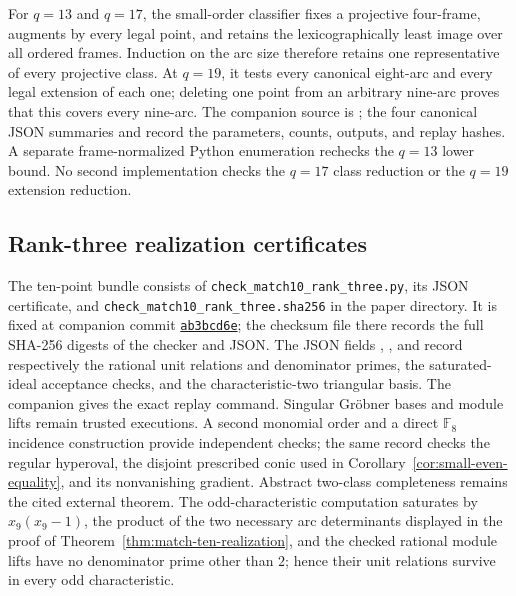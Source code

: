 \documentclass[11pt]{article}
\theoremstyle{definition}
\theoremstyle{remark}
\newcommand{\F}{\mathbb{F}}
\begin{document}
For \(q=13\) and \(q=17\), the small-order classifier fixes a projective
four-frame, augments by every legal point, and retains the lexicographically
least image over all ordered frames.  Induction on the arc size therefore
retains one representative of every projective class.  At \(q=19\), it tests
every canonical eight-arc and every legal extension of each one; deleting one
point from an arbitrary nine-arc proves that this covers every nine-arc.  The companion
source is
; the four canonical JSON
summaries and  record the parameters, counts,
outputs, and replay hashes.  A separate frame-normalized Python enumeration
rechecks the \(q=13\) lower bound.  No second implementation checks the
\(q=17\) class reduction or the \(q=19\) extension reduction.

\subsection{Rank-three realization certificates}
\label{app:rank-three-certificates}

The ten-point bundle consists of
\texttt{check\_match10\_rank\_three.py}, its JSON certificate, and
\texttt{check\_match10\_rank\_three.sha256} in the paper directory.
It is fixed at companion commit
\href{https://github.com/tavisrudd/arcs-complete-outside-conic/commit/ab3bcd6e51f59738acd1a6b04cff5f3867e2838d}
{\texttt{ab3bcd6e}}; the checksum file there records the full SHA-256 digests
of the checker and JSON.  The JSON fields
, , and
 record respectively the rational unit
relations and denominator primes, the saturated-ideal acceptance checks, and
the characteristic-two triangular basis.  The companion gives the exact
replay command.  Singular Gr\"obner bases and
module lifts remain trusted executions.  A second monomial order and a
direct \(\F_8\) incidence construction provide independent checks; the
same record checks the regular hyperoval, the disjoint prescribed conic
used in Corollary~\ref{cor:small-even-equality}, and its nonvanishing
gradient.  Abstract two-class completeness remains the cited external theorem.  The
odd-characteristic computation saturates by
\(x_9(x_9-1)\), the product of the two necessary arc determinants
displayed in the proof of Theorem~\ref{thm:match-ten-realization}, and the checked
rational module lifts have no denominator prime other than \(2\); hence
their unit relations survive in every odd characteristic.
\end{document}
